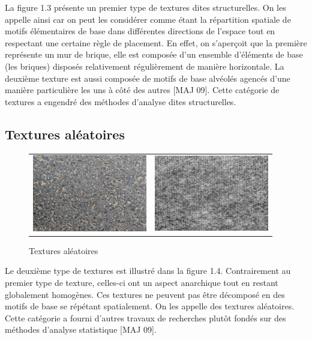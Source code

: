 \indent La figure 1.3 présente un premier type de textures dites structurelles.
On les appelle ainsi car on peut les considérer comme étant la répartition spatiale de motifs élémentaires de base dans différentes directions de l’espace tout en respectant une certaine règle de placement. En effet, on s’aperçoit que la première représente un mur de brique, elle est composée d’un ensemble d’éléments de base (les briques) disposés relativement régulièrement de manière horizontale. La deuxième texture est aussi composée de motifs de base alvéolés agencés d’une manière particulière les uns à côté des autres [MAJ 09].
Cette catégorie de textures a engendré des méthodes d’analyse dites structurelles.

\subsection{Textures aléatoires}

\begin{figure}[H]
\centering
\begin{tabular}{cc}
\centering

\includegraphics[width=5cm,]{Figures/chap1/aleatoire1.png}
&
\includegraphics[width=5cm,]{Figures/chap1/aleatoire2.png}\\

\end{tabular}
\caption[textureAleat]{Textures aléatoires}
\end{figure}


\indent Le deuxième type de textures est illustré dans la figure 1.4. Contrairement au premier type de texture, celles-ci ont un aspect anarchique tout en restant globalement homogènes. Ces textures ne peuvent pas être décomposé en des motifs de base se répétant spatialement. On les appelle des textures aléatoires.
Cette catégorie a fourni d’autres travaux de recherches plutôt fondés sur des méthodes d’analyse statistique [MAJ 09].

